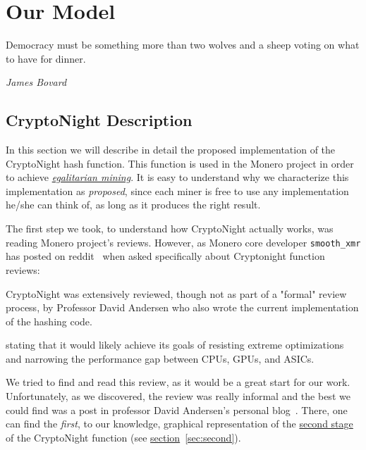 
\chapter{Our Model} \label{ch:cryptonight}
%
\epigraph{Democracy must be something more than two wolves and a sheep voting on what to have for dinner.}{\textit{James Bovard}}
%
\section{CryptoNight Description}
In this section we will describe in detail the proposed implementation of the CryptoNight hash function. This function is used in the Monero project in order to achieve \hyperref[sec:egalitarian]{\emph{egalitarian mining}}. It is easy to understand why we characterize this implementation as \emph{proposed}, since each miner is free to use any implementation he/she can think of, as long as it produces the right result.

The first step we took, to understand how CryptoNight actually works, was reading Monero project's reviews. However, as Monero core developer \verb|smooth_xmr| has posted on reddit~\cite{reddit} when asked specifically about Cryptonight function reviews:
\begin{quoting}
  CryptoNight was extensively reviewed, though not as part of
  a "formal" review process, by Professor David Andersen who
  also wrote the current implementation of the hashing code.

  \noindent [...] stating that it would likely achieve its goals of resisting
  extreme optimizations and narrowing the performance gap between
  CPUs, GPUs, and ASICs.
\end{quoting}

We tried to find and read this review, as it would be a great start for our work. Unfortunately, as we discovered, the review was really informal and the best we could find was a post in professor David Andersen's personal blog~\cite{andersen}. There, one can find the \emph{first}, to our knowledge, graphical representation of the \hyperref[sec:second]{second stage} of the CryptoNight function (see \hyperref[sec:second]{section}~\ref{sec:second}).

